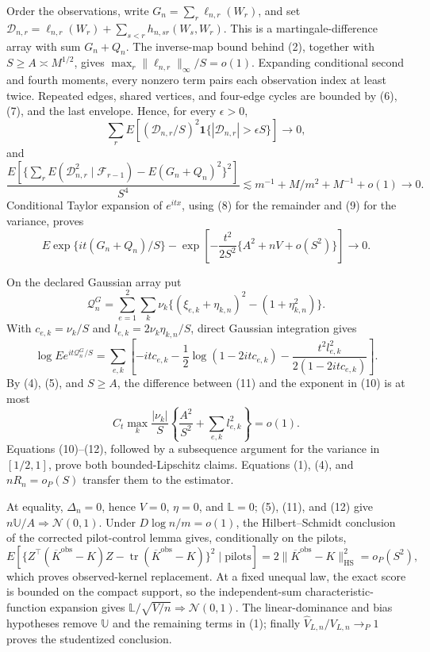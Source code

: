 Order the observations, write \(G_n=\sum_r\ell_{n,r}(W_r)\), and set \(\mathcal D_{n,r}=\ell_{n,r}(W_r)+\sum_{s<r}h_{n,sr}(W_s,W_r)\).  This is a martingale-difference array with sum \(G_n+Q_n\).  The inverse-map bound behind (2), together with \(S\ge A\asymp M^{1/2}\), gives \(\max_r\|\ell_{n,r}\|_\infty/S=o(1)\).  Expanding conditional second and fourth moments, every nonzero term pairs each observation index at least twice.  Repeated edges, shared vertices, and four-edge cycles are bounded by (6), (7), and the last envelope.  Hence, for every \(\epsilon>0\),
\[
\sum_rE[(\mathcal D_{n,r}/S)^2\mathbf1\{|\mathcal D_{n,r}|>\epsilon S\}]\to0, \tag{8}
\]
and
\[
\frac{E[\{\sum_rE(\mathcal D_{n,r}^2\mid\mathcal F_{r-1})-E(G_n+Q_n)^2\}^2]}{S^4}
\lesssim m^{-1}+M/m^2+M^{-1}+o(1)\to0.                                  \tag{9}
\]
Conditional Taylor expansion of \(e^{itx}\), using (8) for the remainder and (9) for the variance, proves
\[
E\exp\{it(G_n+Q_n)/S\}
-\exp\left[-\frac{t^2}{2S^2}\{A^2+nV+o(S^2)\}\right]\to0.              \tag{10}
\]

On the declared Gaussian array put
\[
\mathcal Q_n^G=\sum_{e=1}^2\sum_k\nu_k\{(\xi_{e,k}+\eta_{k,n})^2-(1+\eta_{k,n}^2)\}.
\]
With \(c_{e,k}=\nu_k/S\) and \(l_{e,k}=2\nu_k\eta_{k,n}/S\), direct Gaussian integration gives
\[
\log Ee^{it\mathcal Q_n^G/S}
=\sum_{e,k}\left[-itc_{e,k}-\frac12\log(1-2itc_{e,k})-
\frac{t^2l_{e,k}^2}{2(1-2itc_{e,k})}\right].                             \tag{11}
\]
By (4), (5), and \(S\ge A\), the difference between (11) and the exponent in (10) is at most
\[
C_t\max_k\frac{|\nu_k|}{S}
\left\{\frac{A^2}{S^2}+\sum_{e,k}l_{e,k}^2\right\}=o(1).                \tag{12}
\]
Equations (10)--(12), followed by a subsequence argument for the variance in \([1/2,1]\), prove both bounded-Lipschitz claims.  Equations (1), (4), and \(nR_n=o_P(S)\) transfer them to the estimator.

At equality, \(\Delta_n=0\), hence \(V=0\), \(\eta=0\), and \(\mathbb L=0\); (5), (11), and (12) give \(n\mathbb U/A\Rightarrow\mathcal N(0,1)\).  Under \(D\log n/m=o(1)\), the Hilbert--Schmidt conclusion of the corrected pilot-control lemma gives, conditionally on the pilots,
\[
E[\{Z^{\top}(\overline K^{\mathrm{obs}}-K)Z-\operatorname{tr}(\overline K^{\mathrm{obs}}-K)\}^2\mid\text{pilots}]
=2\|\overline K^{\mathrm{obs}}-K\|_{\mathrm{HS}}^2=o_P(S^2),            \tag{13}
\]
which proves observed-kernel replacement.  At a fixed unequal law, the exact score is bounded on the compact support, so the independent-sum characteristic-function expansion gives \(\mathbb L/\sqrt{V/n}\Rightarrow\mathcal N(0,1)\).  The linear-dominance and bias hypotheses remove \(\mathbb U\) and the remaining terms in (1); finally \(\widehat V_{L,n}/V_{L,n}\to_P1\) proves the studentized conclusion.